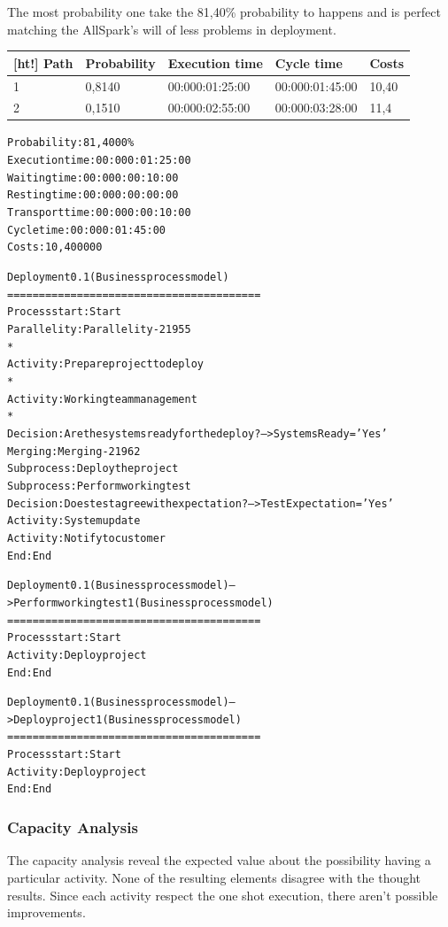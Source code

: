 The most probability one take the 81,40\% probability to happens and is perfect matching the AllSpark's will of less problems in deployment.

\begin{table}
\centering
\begin{tabular}{|l|l|l|l|l|}[ht!]
\hline
Path&Probability&Execution time&Cycle time&Costs\\
\hline
1&0,8140&00:000:01:25:00&00:000:01:45:00&10,40\\
\hline
2&0,1510&00:000:02:55:00&00:000:03:28:00&11,4\\
\hline
\end{tabular}
\end{table}

\begin{alltt}
Probability:   81,4000\%
Execution time:  00:000:01:25:00
Waiting time:  00:000:00:10:00
Resting time:  00:000:00:00:00
Transport time:  00:000:00:10:00
Cycle time:  00:000:01:45:00
Costs:  10,400000

Deployment 0.1 (Business process model)
========================================
Process start: Start
Parallelity: Parallelity-21955
    *
    Activity: Prepare project to deploy
    *
    Activity: Working team management
    *
    Decision: Are the systems ready for the deploy? --> SystemsReady='Yes'
Merging: Merging-21962
Subprocess: Deploy the project
Subprocess: Perform working test
Decision: Does test agree with expectation? --> TestExpectation='Yes'
Activity: System update
Activity: Notify to customer
End: End

Deployment 0.1 (Business process model) --> Perform working test 1 (Business process model)
========================================
Process start: Start
Activity: Deploy project
End: End

Deployment 0.1 (Business process model) --> Deploy project 1 (Business process model)
========================================
Process start: Start
Activity: Deploy project
End: End
\end{alltt}


\subsubsection{Capacity Analysis}
The capacity analysis reveal the expected value about the possibility having a particular activity. None of the resulting elements disagree with the thought results. Since each activity respect the one shot execution, there aren't possible improvements.

